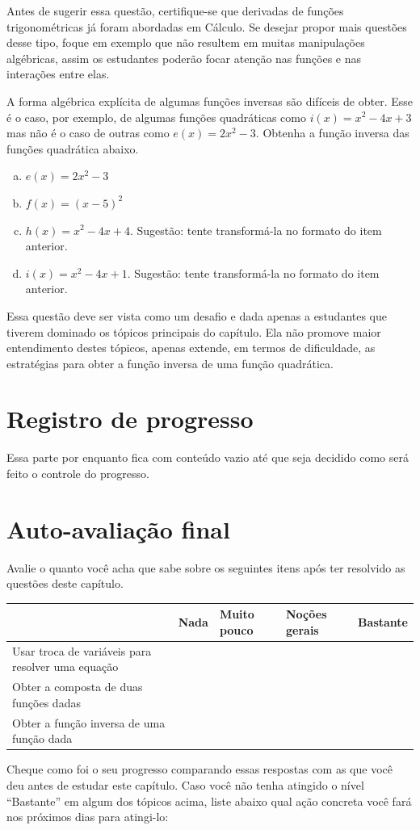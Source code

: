 \documentclass[main.tex]{subfiles}
\begin{document}
Antes de sugerir essa questão, certifique-se que derivadas de funções trigonométricas já foram abordadas em Cálculo. Se desejar propor mais questões desse tipo, foque em exemplo que não resultem em muitas manipulações algébricas, assim os estudantes poderão focar atenção nas funções e nas interações entre elas.

\begin{adicional}
A forma algébrica explícita de algumas funções inversas são difíceis de obter. Esse é o caso, por exemplo, de algumas funções quadráticas como $i(x)=x^2-4x+3$ mas não é o caso de outras como $e(x)=2x^2-3$. Obtenha a função inversa das funções quadrática abaixo.
\begin{enumerate}[a)]
\item $e(x)=2x^2-3$
\item $f(x)=(x-5)^2$
\item $h(x)=x^2-4x+4$. Sugestão: tente transformá-la no formato do item anterior.
\item $i(x)=x^2-4x+1$. Sugestão: tente transformá-la no formato do item anterior.
\end{enumerate}
\end{adicional}

Essa questão deve ser vista como um desafio e dada apenas a estudantes que tiverem dominado os tópicos principais do capítulo. Ela não promove maior entendimento destes tópicos, apenas extende, em termos de dificuldade, as estratégias para obter a função inversa de uma função quadrática.

\paraFolhaAvaliacoes

\section{Registro de progresso}

Essa parte por enquanto fica com conteúdo vazio até que seja decidido como será feito o controle do progresso.

\section{Auto-avaliação final}
Avalie o quanto você acha que sabe sobre os seguintes itens após ter resolvido as questões deste capítulo.

\begin{center}
 \begin{tabular}{|p{35mm}||p{15mm}|p{15mm}|p{15mm}|p{15mm}|} 
 \hline
   & Nada & Muito pouco & Noções gerais & Bastante\\
 \hline
 Usar troca de variáveis para resolver uma equação &  &  &  &  \\ 
 \hline
 Obter a composta de duas funções dadas &  &  &  &  \\
 \hline
 Obter a função inversa de uma função dada &  &  &  &  \\
 \hline
\end{tabular}
\end{center}

Cheque como foi o seu progresso comparando essas respostas com as que você deu antes de estudar este capítulo. Caso você não tenha atingido o nível ``Bastante''  em algum dos tópicos acima, liste abaixo qual ação concreta você fará nos próximos dias para atingi-lo:

\paraAmbos
\end{document}
